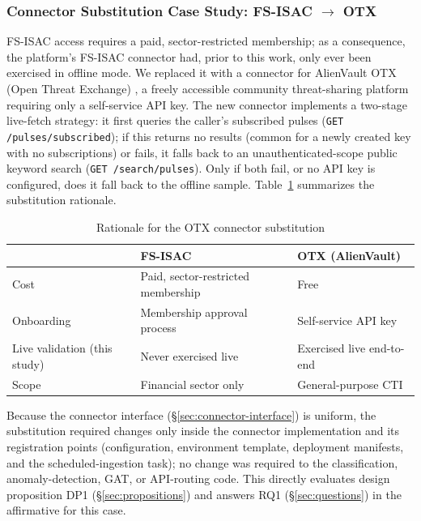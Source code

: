\documentclass[conference]{IEEEtran}
\begin{document}
\subsubsection{Connector Substitution Case Study: FS-ISAC $\rightarrow$ OTX}
\label{sec:migration}
FS-ISAC access requires a paid, sector-restricted membership; as a consequence, the platform's FS-ISAC connector had, prior to this work, only ever been exercised in offline mode. We replaced it with a connector for AlienVault OTX (Open Threat Exchange) \cite{alienvaultotx}, a freely accessible community threat-sharing platform requiring only a self-service API key. The new connector implements a two-stage live-fetch strategy: it first queries the caller's subscribed pulses (\texttt{GET /pulses/subscribed}); if this returns no results (common for a newly created key with no subscriptions) or fails, it falls back to an unauthenticated-scope public keyword search (\texttt{GET /search/pulses}). Only if both fail, or no API key is configured, does it fall back to the offline sample. Table~\ref{tab:otx-vs-fsisac} summarizes the substitution rationale.

\begin{table}[h]
\caption{Rationale for the OTX connector substitution}
\label{tab:otx-vs-fsisac}
\centering
\begin{tabular}{@{}p{1.4cm}p{2.9cm}p{2.9cm}@{}}
\toprule
 & \textbf{FS-ISAC} & \textbf{OTX (AlienVault)} \\
\midrule
Cost & Paid, sector-restricted membership & Free \\
Onboarding & Membership approval process & Self-service API key \\
Live validation (this study) & Never exercised live & Exercised live end-to-end \\
Scope & Financial sector only & General-purpose CTI \\
\bottomrule
\end{tabular}
\end{table}

Because the connector interface (\S\ref{sec:connector-interface}) is uniform, the substitution required changes only inside the connector implementation and its registration points (configuration, environment template, deployment manifests, and the scheduled-ingestion task); no change was required to the classification, anomaly-detection, GAT, or API-routing code. This directly evaluates design proposition DP1 (\S\ref{sec:propositions}) and answers RQ1 (\S\ref{sec:questions}) in the affirmative for this case.
\end{document}
